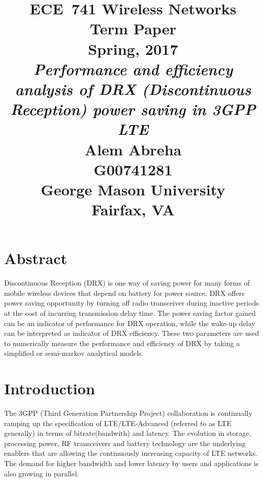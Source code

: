 \documentclass[8pt]{article}
\begin{document}
\pagestyle{empty}
\title{\huge{ECE~741 Wireless Networks\\Term Paper\\Spring, 2017}
\vspace{50mm} \\\LARGE{\emph{Performance and efficiency analysis of DRX (Discontinuous Reception) power saving in 3GPP LTE}}\vspace{50mm}
\\\large{Alem Abreha\\ G00741281}\vspace{5mm}
\\\large{George Mason University\\Fairfax, VA}}
\date{}
\maketitle
\section*{Abstract}

Discontinuous Reception (DRX) is one way of saving power for many forms of mobile wireless devices that depend on battery for power source. DRX offers power saving opportunity by turning off radio transceiver during inactive periods at the cost of incurring transmission delay time. The power saving factor gained can be an indicator of performance for DRX operation, while the wake-up delay can be interpreted as indicator of DRX efficiency. These two parameters are used to numerically measure the performance and efficiency of DRX by taking a simplified or semi-markov analytical models.
 

\section*{Introduction}

 The 3GPP (Third Generation Partnership Project) collaboration is continually ramping up the specification of LTE/LTE-Advanced (referred to as LTE generally) in terms of bitrate(bandwith) and latency. The evolution in storage, processing power, RF transceivers and battery technology are the underlying enablers that are  allowing the continuously increasing capacity of LTE networks\cite{holma2012lte}. The demand for higher bandwidth and lower latency by users and applications is also growing in parallel. 

\end{document}
